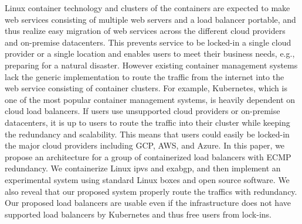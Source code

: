 Linux container technology and clusters of the containers are expected to make web services consisting of multiple web servers and a load balancer portable, and thus realize easy migration of web services across the different cloud providers and on-premise datacenters.
This prevents service to be locked-in a single cloud provider or a single location and enables users to meet their business needs, e.g., preparing for a natural disaster.
However existing container management systems lack the generic implementation to route the traffic from the internet into the web service consisting of container clusters.
For example, Kubernetes, which is one of the most popular container management systems, is heavily dependent on cloud load balancers. If users use unsupported cloud providers or on-premise datacenters, it is up to users to route the traffic into their cluster while keeping the redundancy and scalability.
This means that users could easily be locked-in the major cloud providers including GCP, AWS, and Azure.
In this paper, we propose an architecture for a group of containerized load balancers with ECMP redundancy.
We containerize Linux ipvs and exabgp, and then implement an experimental system using standard Linux boxes and open source software.
We also reveal that our proposed system properly route the traffics with redundancy.
Our proposed load balancers are usable even if the infrastructure does not have supported load balancers by Kubernetes and thus free users from lock-ins.

